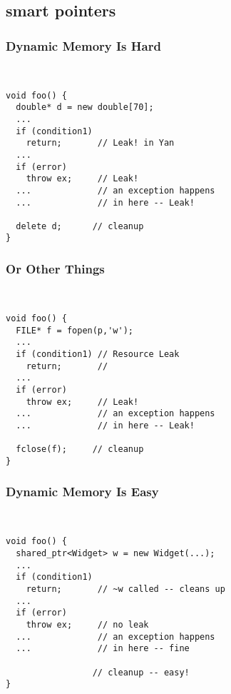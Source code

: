 
\subsection{smart pointers} \lyxframeend{}

\begin{frame}[fragile,t]
\frametitle{Dynamic Memory Is Hard}
{\scriptsize\
\begin{verbatim}
void foo() {
  double* d = new double[70];
  ...
  if (condition1)
    return;       // Leak! in Yan 
  ...
  if (error)
    throw ex;     // Leak!
  ...             // an exception happens
  ...             // in here -- Leak!

  delete d;      // cleanup
}
\end{verbatim}
}
\end{frame}

\begin{frame}[fragile,t]
\frametitle{Or Other Things}
{\scriptsize\
\begin{verbatim}
void foo() {
  FILE* f = fopen(p,'w');    
  ...
  if (condition1) // Resource Leak
    return;       // 
  ...
  if (error)
    throw ex;     // Leak!
  ...             // an exception happens
  ...             // in here -- Leak!

  fclose(f);     // cleanup
}
\end{verbatim}
}
\pause
\center{ \textcolor{purple} {Mutexes?  Run Away!}}

\end{frame}

\begin{frame}[fragile,t]
\frametitle{Dynamic Memory Is Easy}
{\scriptsize\
\begin{verbatim}
void foo() {
  shared_ptr<Widget> w = new Widget(...);
  ...
  if (condition1)
    return;       // ~w called -- cleans up
  ...
  if (error)
    throw ex;     // no leak
  ...             // an exception happens
  ...             // in here -- fine

                 // cleanup -- easy!
}
\end{verbatim}
}
\end{frame}




